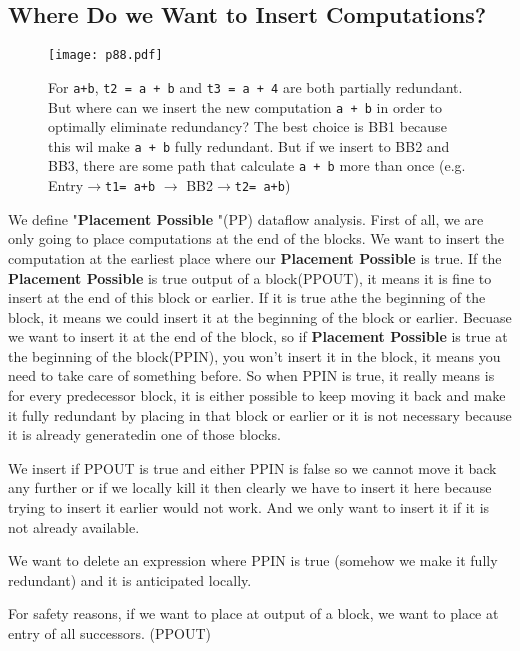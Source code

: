 \subsection{Where Do we Want to Insert Computations?}


\begin{figure}[H]
	\centering
	\texttt{[image: p88.pdf]}
	\caption{For \texttt{a+b}, \texttt{t2 = a + b} and \texttt{t3 = a + 4} are both partially redundant. But where can we insert the new computation \texttt{a + b} in order to optimally eliminate redundancy?
		The best choice is BB1 because this wil  make \texttt{a + b} fully redundant. But if we insert to BB2 and BB3, there are some path that calculate \texttt{a + b} more than once (e.g. Entry$\rightarrow$\texttt{t1= a+b} $\rightarrow$ BB2$\rightarrow$\texttt{t2= a+b}) }
	\label{fig:p88}
\end{figure}

We define "\textbf{Placement Possible }"(PP) dataflow analysis. First of all, we are only going to place computations at the end of the blocks.
We want to insert the computation at the earliest place where our \textbf{Placement Possible }is true. If the \textbf{Placement Possible }is true output of a block(PPOUT), it means
it is fine to insert at the end of this block or earlier. If it is true athe the beginning of the block, it means we could insert it at the beginning of the block or earlier. Becuase we want to
insert it at the end of the block, so if \textbf{Placement Possible }is true at the beginning of the block(PPIN), you won't insert it in the block, it means you need to take care of something before.
So when PPIN is true, it really means is for every predecessor block, it is either possible to keep moving it back and make it fully redundant by placing in that block or earlier or it is not necessary because
it is already generatedin one of those blocks.

We insert if PPOUT is true and either PPIN is false so we cannot move it back any further or if we locally kill it then clearly we have to insert it here because trying to insert it earlier would not work. And we only want to insert it if it is not
already available.


We want to delete an expression where PPIN is true (somehow we make it fully redundant) and it is anticipated locally.


For safety reasons, if we want to place at output of a block, we want to place at entry of all successors. (PPOUT)

